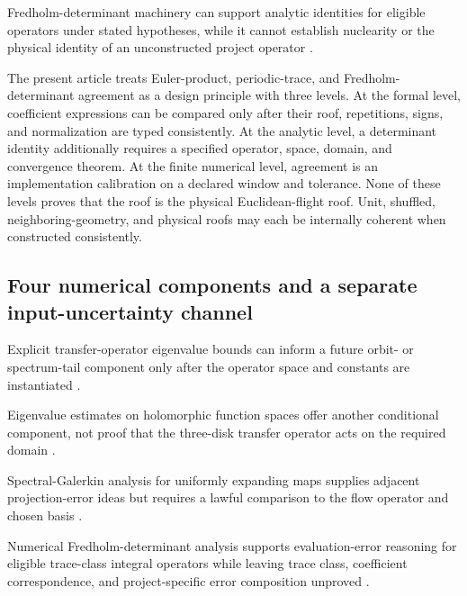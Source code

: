 \documentclass[11pt,a4paper]{article}
\begin{document}
Fredholm-determinant machinery can support analytic identities for eligible operators under stated hypotheses, while it cannot establish nuclearity or the physical identity of an unconstructed project operator
\citep{P30-S14}.

The present article treats Euler-product, periodic-trace, and Fredholm-determinant agreement as a design principle with three levels. At the formal level, coefficient expressions can be compared only after their roof, repetitions, signs, and normalization are typed consistently. At the analytic level, a determinant identity additionally requires a specified operator, space, domain, and convergence theorem. At the finite numerical level, agreement is an implementation calibration on a declared window and tolerance. None of these levels proves that the roof is the physical Euclidean-flight roof. Unit, shuffled, neighboring-geometry, and physical roofs may each be internally coherent when constructed consistently.

\subsection{Four numerical components and a separate input-uncertainty channel}

Explicit transfer-operator eigenvalue bounds can inform a future orbit- or spectrum-tail component only after the operator space and constants are instantiated
\citep{P30-S19}.

Eigenvalue estimates on holomorphic function spaces offer another conditional component, not proof that the three-disk transfer operator acts on the required domain
\citep{P30-S20}.

Spectral-Galerkin analysis for uniformly expanding maps supplies adjacent projection-error ideas but requires a lawful comparison to the flow operator and chosen basis
\citep{P30-S21}.

Numerical Fredholm-determinant analysis supports evaluation-error reasoning for eligible trace-class integral operators while leaving trace class, coefficient correspondence, and project-specific error composition unproved
\citep{P30-S22}.
\end{document}
